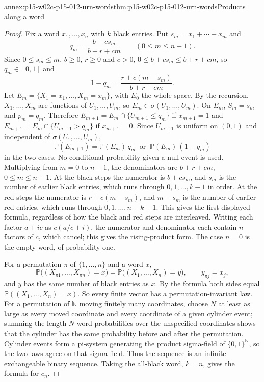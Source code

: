 \begin{annexitem}{annex:p15-w02c-p15-012-urn-words}{thm:p15-w02c-p15-012-urn-words}{Products along a word}
\begin{proof}
Fix a word \(x_1,\ldots,x_n\) with \(k\) black entries. Put
\(s_m=x_1+\cdots+x_m\) and
\[
 q_m=\frac{b+cs_m}{b+r+cm}\qquad(0\leq m\leq n-1).
\]
Since \(0\leq s_m\leq m\), \(b\geq0\), \(r\geq0\) and \(c>0\),
\(0\leq b+cs_m\leq b+r+cm\), so \(q_m\in[0,1]\) and
\[
 1-q_m=\frac{r+c(m-s_m)}{b+r+cm}.
\]
Let \(E_m=\{X_1=x_1,\ldots,X_m=x_m\}\), with \(E_0\) the whole space.
By the recursion, \(X_1,\ldots,X_m\) are functions of
\(U_1,\ldots,U_m\), so \(E_m\in\sigma(U_1,\ldots,U_m)\). On \(E_m\),
\(S_m=s_m\) and \(p_m=q_m\). Therefore
\(E_{m+1}=E_m\cap\{U_{m+1}\leq q_m\}\) if \(x_{m+1}=1\) and
\(E_{m+1}=E_m\cap\{U_{m+1}>q_m\}\) if \(x_{m+1}=0\). Since \(U_{m+1}\) is
uniform on \((0,1)\) and independent of \(\sigma(U_1,\ldots,U_m)\),
\[
 \mathbb P(E_{m+1})=\mathbb P(E_m)\,q_m\ \text{ or }\
 \mathbb P(E_m)\,(1-q_m)
\]
in the two cases. No conditional probability given a null event is used.
Multiplying from \(m=0\) to \(n-1\), the denominators are
\(b+r+cm\), \(0\leq m\leq n-1\). At the black steps the numerator is
\(b+cs_m\), and \(s_m\) is the number of earlier black entries, which runs
through \(0,1,\ldots,k-1\) in order. At the red steps the numerator is
\(r+c(m-s_m)\), and \(m-s_m\) is the number of earlier red entries, which
runs through \(0,1,\ldots,n-k-1\). This gives the first displayed
formula, regardless of how the black and red steps are interleaved.
Writing each factor \(a+ic\) as \(c(a/c+i)\), the numerator and
denominator each contain \(n\) factors of \(c\), which cancel; this gives
the rising-product form. The case \(n=0\) is the empty word, of
probability one.

For a permutation \(\pi\) of \(\{1,\ldots,n\}\) and a word \(x\),
\[
 \mathbb P\big((X_{\pi1},\ldots,X_{\pi n})=x\big)
   =\mathbb P\big((X_1,\ldots,X_n)=y\big),\qquad y_{\pi j}=x_j ,
\]
and \(y\) has the same number of black entries as \(x\). By the formula
both sides equal \(\mathbb P((X_1,\ldots,X_n)=x)\). So every finite
vector has a permutation-invariant law. For a permutation of
\(\mathbb N\) moving finitely many coordinates, choose \(N\) at least as
large as every moved coordinate and every coordinate of a given cylinder
event; summing the length-\(N\) word probabilities over the unspecified
coordinates shows that the cylinder has the same probability before and
after the permutation. Cylinder events form a pi-system generating the
product sigma-field of \(\{0,1\}^{\mathbb N}\), so the two laws agree on
that sigma-field. Thus the sequence is an infinite exchangeable binary
sequence. Taking the all-black word, \(k=n\), gives the formula for
\(c_n\).
\end{proof}
\end{annexitem}

